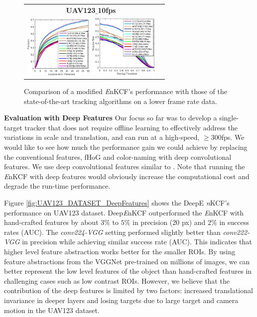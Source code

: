 \documentclass[10pt,twocolumn,letterpaper]{article}
\begin{document}
\begin{figure}[!h]
\centering
\begin{tabular}{cc}
\tiny\quad\textbf{UAV123$\_$10fps}\\
\includegraphics[width=3.32cm]{./figures/pr_uav123_10fps.eps}
\includegraphics[width=3.30cm]{./figures/sr_uav123_10fps.eps}\\
\end{tabular}
\caption{Comparison of a modified {\it E}nKCF's performance with those
  of the state-of-the-art tracking algorithms on a lower frame rate
  data.}
\label{fig:UAV123_10fpsDATASET}
\end{figure}

\textbf{Evaluation with Deep Features} Our focus so far was to develop
a single-target tracker that does not require offline learning to
effectively address the variations in scale and translation, and can
run at a high-speed, $\ge 300$fps. We would like to see how much the
performance gain we could achieve by replacing the conventional
features, fHoG and color-naming with deep convolutional features. We
use deep convolutional features similar to \cite{ma2015hierarchical,
  danelljan2015convolutional}. Note that running the {\it E}nKCF with
deep features would obviously increase the computational cost and
degrade the run-time performance. 

Figure \ref{fig:UAV123_DATASET_DeepFeatures} shows the DeepE{\it
  n}KCF's performance on UAV123 dataset. Deep{\it E}nKCF outperformed
the {\it E}nKCF with hand-crafted features by about $3\%$ to $5\%$ in
precision (20 px) and $2\%$ in success rates (AUC). The
\textit{conv224-VGG} setting performed slightly better than
\textit{conv222-VGG} in precision while achieving similar success rate
(AUC). This indicates that higher level feature abstraction works
better for the smaller ROIs. By using feature abstractions from the
VGGNet pre-trained on millions of images, we can better represent the
low level features of the object than hand-crafted features in
challenging cases such as low contrast ROIs. However, we believe that
the contribution of the deep features is limited by two factors:
increased translational invariance in deeper layers and losing targets
due to large target and camera motion in the UAV123 dataset.
\end{document}
